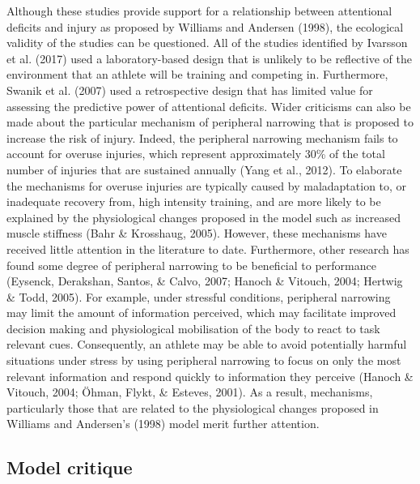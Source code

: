 \documentclass[man,floatsintext]{apa6}
\begin{document}
Although these studies provide support for a relationship between attentional deficits and injury as proposed by Williams and Andersen (1998), the ecological validity of the studies can be questioned.
All of the studies identified by Ivarsson et al. (2017) used a laboratory-based design that is unlikely to be reflective of the environment that an athlete will be training and competing in.
Furthermore, Swanik et al. (2007) used a retrospective design that has limited value for assessing the predictive power of attentional deficits.
Wider criticisms can also be made about the particular mechanism of peripheral narrowing that is proposed to increase the risk of injury.
Indeed, the peripheral narrowing mechanism fails to account for overuse injuries, which represent approximately 30\% of the total number of injuries that are sustained annually (Yang et al., 2012).
To elaborate the mechanisms for overuse injuries are typically caused by maladaptation to, or inadequate recovery from, high intensity training,
and are more likely to be explained by the physiological changes proposed in the model such as increased muscle stiffness (Bahr \& Krosshaug, 2005).
However, these mechanisms have received little attention in the literature to date.
Furthermore, other research has found some degree of peripheral narrowing to be beneficial to performance (Eysenck, Derakshan, Santos, \& Calvo, 2007; Hanoch \& Vitouch, 2004; Hertwig \& Todd, 2005).
For example, under stressful conditions, peripheral narrowing may limit the amount of information perceived, which may facilitate improved decision making and physiological mobilisation of the body to react to task relevant cues.
Consequently, an athlete may be able to avoid potentially harmful situations under stress by using peripheral narrowing to focus on only the most relevant information and respond quickly to information they perceive (Hanoch \& Vitouch, 2004; Öhman, Flykt, \& Esteves, 2001).
As a result, mechanisms, particularly those that are related to the physiological changes proposed in Williams and Andersen's (1998) model merit further attention.

\hypertarget{model-critique}{%
\subsection{Model critique}\label{model-critique}}
\end{document}
